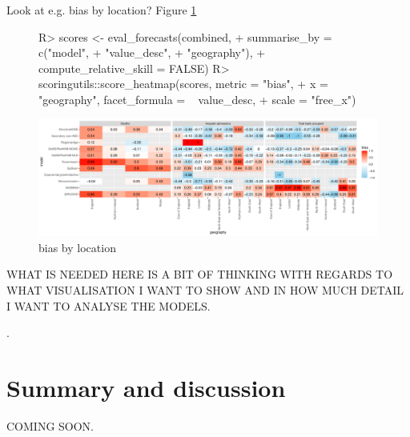 \documentclass[article]{jss}
\begin{document}
Look at e.g. bias by location? Figure \ref{fig:bias-heatmap}

\begin{figure}[h]
\centering
\begin{Schunk}
\begin{Sinput}
R> scores <- eval_forecasts(combined, 
+                           summarise_by = c("model",
+                                            "value_desc", 
+                                            "geography"), 
+                           compute_relative_skill = FALSE)
R> scoringutils::score_heatmap(scores, metric = "bias", 
+                              x = "geography", facet_formula = ~ value_desc, 
+                              scale = "free_x")
\end{Sinput}
\end{Schunk}
\includegraphics{plots/plot-calibration}
\caption{\label{fig:bias-heatmap} bias by location}
\end{figure}

WHAT IS NEEDED HERE IS A BIT OF THINKING WITH REGARDS TO WHAT VISUALISATION I WANT TO SHOW AND IN HOW MUCH DETAIL I WANT TO ANALYSE THE MODELS. 


\begin{CodeInput}
.
\end{CodeInput}







\section{Summary and discussion} \label{sec:summary}

COMING SOON. 


\end{document}
